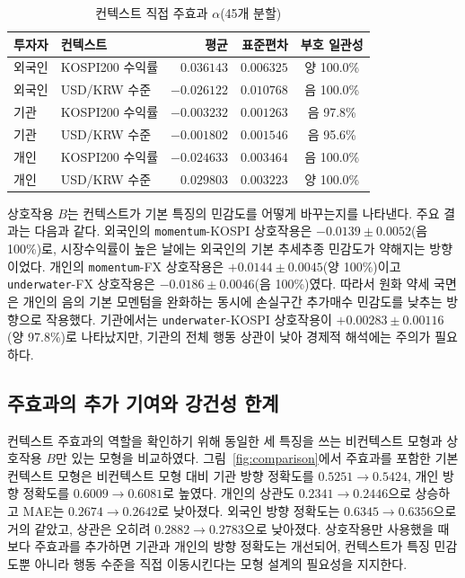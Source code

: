 \documentclass[sigconf,nonacm]{acmart}
\begin{document}
\begin{table}[t]
  \caption{컨텍스트 직접 주효과 $\alpha$(45개 분할)}
  \label{tab:alpha}
  \centering
  \scriptsize
  \begin{tabular}{@{}llrrc@{}}
    \toprule
    투자자 & 컨텍스트 & 평균 & 표준편차 & 부호 일관성 \\
    \midrule
    외국인 & KOSPI200 수익률 &  $0.036143$ & $0.006325$ & 양 100.0\% \\
    외국인 & USD/KRW 수준    & $-0.026122$ & $0.010768$ & 음 100.0\% \\
    기관   & KOSPI200 수익률 & $-0.003232$ & $0.001263$ & 음 97.8\% \\
    기관   & USD/KRW 수준    & $-0.001802$ & $0.001546$ & 음 95.6\% \\
    개인   & KOSPI200 수익률 & $-0.024633$ & $0.003464$ & 음 100.0\% \\
    개인   & USD/KRW 수준    &  $0.029803$ & $0.003223$ & 양 100.0\% \\
    \bottomrule
  \end{tabular}
\end{table}

상호작용 $B$는 컨텍스트가 기본 특징의 민감도를 어떻게 바꾸는지를 나타낸다.
주요 결과는 다음과 같다. 외국인의 \texttt{momentum}-KOSPI 상호작용은
$-0.0139\pm0.0052$(음 100\%)로, 시장수익률이 높은 날에는 외국인의 기본
추세추종 민감도가 약해지는 방향이었다. 개인의 \texttt{momentum}-FX 상호작용은
$+0.0144\pm0.0045$(양 100\%)이고 \texttt{underwater}-FX 상호작용은
$-0.0186\pm0.0046$(음 100\%)였다. 따라서 원화 약세 국면은 개인의 음의 기본
모멘텀을 완화하는 동시에 손실구간 추가매수 민감도를 낮추는 방향으로 작용했다.
기관에서는 \texttt{underwater}-KOSPI 상호작용이 $+0.00283\pm0.00116$(양 97.8\%)로
나타났지만, 기관의 전체 행동 상관이 낮아 경제적 해석에는 주의가 필요하다.

\subsection{주효과의 추가 기여와 강건성 한계}

컨텍스트 주효과의 역할을 확인하기 위해 동일한 세 특징을 쓰는 비컨텍스트 모형과
상호작용 $B$만 있는 모형을 비교하였다. 그림~\ref{fig:comparison}에서 주효과를
포함한 기본 컨텍스트 모형은 비컨텍스트 모형 대비 기관 방향 정확도를
$0.5251\rightarrow0.5424$, 개인 방향 정확도를 $0.6009\rightarrow0.6081$로
높였다. 개인의 상관도 $0.2341\rightarrow0.2446$으로 상승하고 MAE는
$0.2674\rightarrow0.2642$로 낮아졌다. 외국인 방향 정확도는
$0.6345\rightarrow0.6356$으로 거의 같았고, 상관은 오히려
$0.2882\rightarrow0.2783$으로 낮아졌다. 상호작용만 사용했을 때보다 주효과를
추가하면 기관과 개인의 방향 정확도는 개선되어, 컨텍스트가 특징 민감도뿐 아니라
행동 수준을 직접 이동시킨다는 모형 설계의 필요성을 지지한다.
\end{document}
